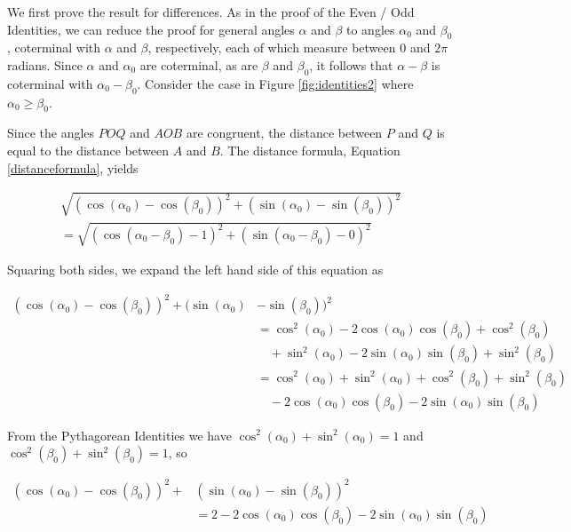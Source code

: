 We first prove the result for differences.  As in the proof of the Even / Odd Identities, we can reduce the proof for general angles $\alpha$ and $\beta$ to angles $\alpha_{0}$ and $\beta_{0}$, coterminal with $\alpha$ and $\beta$, respectively, each of which measure between $0$ and $2\pi$ radians.  Since $\alpha$ and $\alpha_{0}$ are coterminal, as are $\beta$ and $\beta_{0}$, it follows that $\alpha - \beta$ is coterminal with $\alpha_{0} - \beta_{0}$.  Consider the case in Figure \ref{fig:identities2} where $\alpha_{0} \geq \beta_{0}$.  

Since the angles $POQ$ and $AOB$ are congruent, the distance between $P$ and $Q$ is equal to the distance between $A$ and $B$.   The distance formula, Equation \ref{distanceformula}, yields

\begin{multline*}
\sqrt{(\cos(\alpha_{0}) - \cos(\beta_{0}))^2 + (\sin(\alpha_{0}) - \sin(\beta_{0}))^2 }\\
=\sqrt{(\cos(\alpha_{0} - \beta_{0}) - 1)^2 + (\sin(\alpha_{0} - \beta_{0}) - 0)^2}
\end{multline*}

Squaring both sides, we expand the left hand side of this equation as

\begin{align*}
(\cos(\alpha_{0}) - \cos(\beta_{0}))^2 + (\sin(\alpha_{0})& - \sin(\beta_{0}))^2 \\
& = \cos^2(\alpha_{0}) - 2\cos(\alpha_{0})\cos(\beta_{0}) + \cos^2(\beta_{0}) \\  
& \quad + \sin^2(\alpha_{0}) - 2\sin(\alpha_{0})\sin(\beta_{0})  +  \sin^2(\beta_{0}) \\ 
& =  \cos^2(\alpha_{0}) + \sin^2(\alpha_{0}) + \cos^2(\beta_{0}) + \sin^2(\beta_{0}) \\
& \quad -  2\cos(\alpha_{0})\cos(\beta_{0}) - 2\sin(\alpha_{0})\sin(\beta_{0})
\end{align*}

From the Pythagorean Identities we have  $\cos^2(\alpha_{0}) + \sin^2(\alpha_{0}) = 1$ and $\cos^2(\beta_{0}) + \sin^2(\beta_{0}) = 1$, so

\begin{align*}
(\cos(\alpha_{0}) - \cos(\beta_{0}))^2 +& (\sin(\alpha_{0}) - \sin(\beta_{0}))^2 \\
& = 2  - 2\cos(\alpha_{0})\cos(\beta_{0}) - 2\sin(\alpha_{0})\sin(\beta_{0})
\end{align*}


